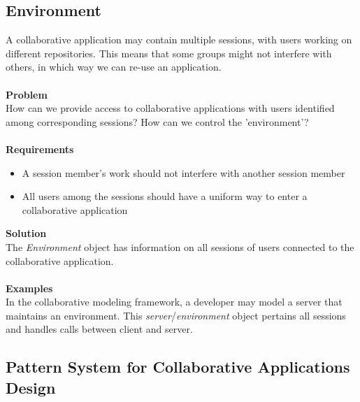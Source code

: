 \subsection{Environment}

A collaborative application may contain multiple sessions, with users working on different repositories. This means that some groups might not interfere with others, in which way we can re-use an application.
\\ \\
\textbf{Problem}
\\
How can we provide access to collaborative applications with users identified among corresponding sessions? How can we control the 'environment'?
\\ \\
\textbf{Requirements}
\begin{itemize}
\item{A session member's work should not interfere with another session member}
\item{All users among the sessions should have a uniform way to enter a collaborative application}
\end{itemize}
\textbf{Solution}
\\
The \textit{Environment} object has information on all sessions of users connected to the collaborative application.
\\ \\
\textbf{Examples}
\\
In the collaborative modeling framework, a developer may model a server that maintains an environment. This \textit{server}/\textit{environment} object pertains all sessions and handles calls between client and server.

\subsection{Pattern System for Collaborative Applications Design}

